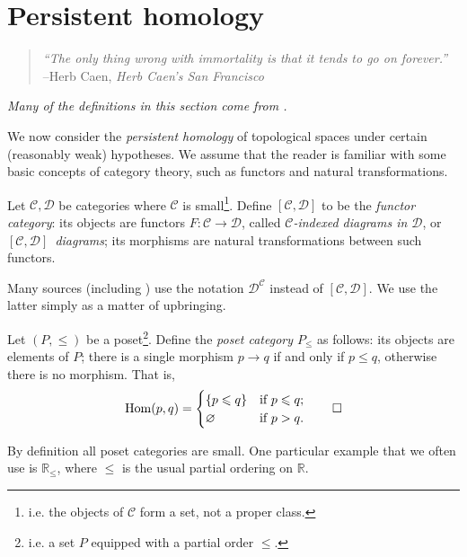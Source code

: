 \documentclass[12pt]{article}
\numberwithin{equation}{subsection}
\numberwithin{theorem}{subsection}
\numberwithin{lemma}{subsection}
\numberwithin{corollary}{subsection}
\numberwithin{definition}{subsection}
\numberwithin{example}{subsection}
\numberwithin{note}{subsection}
\newcommand{\rr}{\mathbb{R}}
\newcommand{\rrleq}{\rr_\leqslant}
\newcommand{\ccat}{\mathcal{C}}
\newcommand{\dcat}{\mathcal{D}}
\newcommand{\Hom}{\mathrm{Hom}}
\begin{document}
    \section{Persistent homology} %
    \label{sec:persistent_homology}

        \begin{quotation}
            \raggedleft
            \emph{``The only thing wrong with immortality is that it tends to go on forever.''}\\
            --Herb Caen, \emph{Herb Caen's San Francisco}
        \end{quotation}

        \emph{Many of the definitions in this section come from \cite{Bubenik:dn}.}

        \bigskip

        We now consider the \emph{persistent homology} of topological spaces under certain (reasonably weak) hypotheses.
        We assume that the reader is familiar with some basic concepts of category theory, such as functors and natural transformations.

        \begin{definition}
            Let $\ccat,\dcat$ be categories where $\ccat$ is small\footnote{
                i.e. the objects of $\ccat$ form a set, not a proper class.
            }.
            Define $[\ccat,\dcat]$ to be the \emph{functor category}: its objects are functors $F\colon\ccat\to\dcat$, called \emph{$\ccat$-indexed diagrams in $\dcat$}, or \emph{\mbox{$[\ccat,\dcat]$ diagrams}}; its morphisms are natural transformations between such functors.
        \end{definition}

        \begin{note}
            Many sources (including \cite{Bubenik:dn}) use the notation $\dcat^\ccat$ instead of $[\ccat,\dcat]$.
            We use the latter simply as a matter of upbringing.
        \end{note}

        \begin{definition}
            Let $(P,\leqslant)$ be a poset\footnote{
                i.e. a set $P$ equipped with a partial order $\leqslant$.
            }.
            Define the \emph{poset category $P_\leqslant$} as follows: its objects are elements of $P$; there is a single morphism $p\to q$ if and only if $p\leqslant q$, otherwise there is no morphism.
            That is,
            \begin{equation*}
                \Hom(p,q)=
                \begin{cases}
                    \{p\leqslant q\} &\mbox{if } p\leqslant q;\\
                    \varnothing &\mbox{if } p>q.
                \end{cases}\qedhere
            \end{equation*}
        \end{definition}
        By definition all poset categories are small.
        One particular example that we often use is $\rrleq$, where $\leqslant$ is the usual partial ordering on $\rr$.
\end{document}
